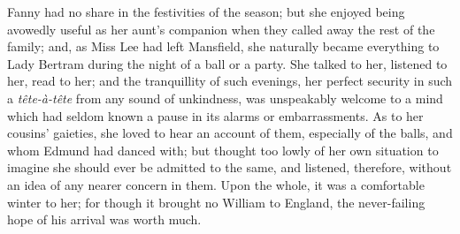 \documentclass{article}
\begin{document}
Fanny had no share in the festivities of the season;
but she enjoyed being avowedly useful as her aunt's companion
when they called away the rest of the family; and, as Miss
Lee had left Mansfield, she naturally became everything
to Lady Bertram during the night of a ball or a party.
She talked to her, listened to her, read to her;
and the tranquillity of such evenings, her perfect security
in such a \emph{t\^{e}te-\`{a}-t\^{e}te} from any sound of unkindness,
was unspeakably welcome to a mind which had seldom
known a pause in its alarms or embarrassments.  As to
her cousins' gaieties, she loved to hear an account of them,
especially of the balls, and whom Edmund had danced with;
but thought too lowly of her own situation to imagine
she should ever be admitted to the same, and listened,
therefore, without an idea of any nearer concern in them.
Upon the whole, it was a comfortable winter to her;
for though it brought no William to England, the never-failing
hope of his arrival was worth much.
\end{document}
